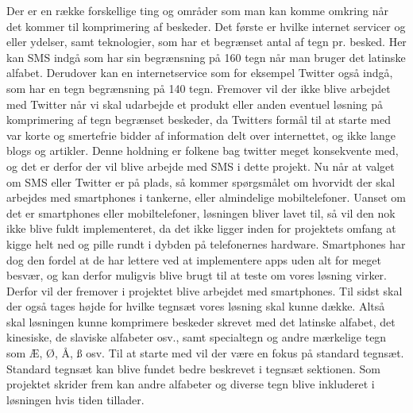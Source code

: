 Der er en række forskellige ting og områder som man kan komme omkring når det kommer til komprimering af beskeder. Det første er hvilke internet servicer og eller ydelser, samt teknologier, som har et begrænset antal af tegn pr. besked. Her kan SMS indgå som har sin begrænsning på 160 tegn når man bruger det latinske alfabet\cite{Pro_1}. Derudover kan en internetservice som for eksempel Twitter også indgå, som har en tegn begrænsning på 140 tegn\cite{pro_af1}. Fremover vil der ikke blive arbejdet med Twitter når vi skal udarbejde et produkt eller anden eventuel løsning på komprimering af tegn begrænset beskeder, da Twitters formål til at starte med var korte og smertefrie bidder af information delt over internettet, og ikke lange blogs og artikler. Denne holdning er folkene bag twitter meget konsekvente med\cite{pro_af2}, og det er derfor der vil blive arbejde med SMS i dette projekt.
Nu når at valget om SMS eller Twitter er på plads, så kommer spørgsmålet om hvorvidt der skal arbejdes med smartphones i tankerne, eller almindelige mobiltelefoner. Uanset om det er smartphones eller mobiltelefoner, løsningen bliver lavet til, så vil den nok ikke blive fuldt implementeret, da det ikke ligger inden for projektets omfang at kigge helt ned og pille rundt i dybden på telefonernes hardware. Smartphones har dog den fordel at de har lettere ved at implementere apps uden alt for meget besvær, og kan derfor muligvis blive brugt til at teste om vores løsning virker. Derfor vil der fremover i projektet blive arbejdet med smartphones.
Til sidst skal der også tages højde for hvilke tegnsæt vores løsning skal kunne dække. Altså skal løsningen kunne komprimere beskeder skrevet med det latinske alfabet, det kinesiske, de slaviske alfabeter osv., samt specialtegn og andre mærkelige tegn som Æ, Ø, Å, ß osv. Til at starte med vil der være en fokus på standard tegnsæt. Standard tegnsæt kan blive fundet bedre beskrevet i tegnsæt sektionen. Som projektet skrider frem kan andre alfabeter og diverse tegn blive inkluderet i løsningen hvis tiden tillader.